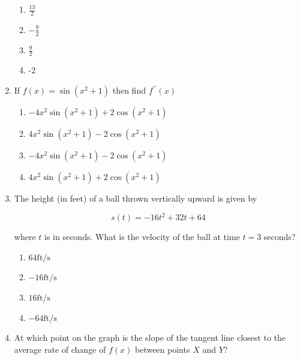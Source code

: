 \documentclass{article}
\begin{document}
\begin{enumerate}
\begin{minipage}[t]{\linewidth}
		\begin{enumerate}
		\setlength\itemsep{2em}
			\item  $\frac{13}{2}$ 
			\item  $-\frac{9}{2}$ 
			\item  $\frac{9}{2}$ 
			\item  -2 
		\end{enumerate}
	\end{minipage}
	\item
	\begin{minipage}[t]{\linewidth}
		If \(f(x)=\sin \left(x^{2}+1\right)\) then find \(f^{\prime \prime}(x)\)


		\vspace{1em}

		\begin{enumerate}
		\setlength\itemsep{2em}
			\item  $-4 x^{2} \sin \left(x^{2}+1\right)+2 \cos \left(x^{2}+1\right)$ 
			\item  $4 x^{2} \sin \left(x^{2}+1\right)-2 \cos \left(x^{2}+1\right)$ 
			\item  $-4 x^{2} \sin \left(x^{2}+1\right)-2 \cos \left(x^{2}+1\right)$ 
			\item  $4 x^{2} \sin \left(x^{2}+1\right)+2 \cos \left(x^{2}+1\right)$ 
		\end{enumerate}
	\end{minipage}
	\item
	\begin{minipage}[t]{\linewidth}
		The height (in feet) of a ball thrown vertically upward is given by

\[
s(t)=-16 t^{2}+32 t+64
\]

where \(t\) is in seconds. What is the velocity of the ball at time
\(t=3\) seconds?


		\vspace{1em}

		\begin{enumerate}
		\setlength\itemsep{2em}
			\item  $64 \mathrm{ft} / \mathrm{s}$ 
			\item  $-16 \mathrm{ft} / \mathrm{s}$ 
			\item  $16 \mathrm{ft} / \mathrm{s}$ 
			\item  $-64 \mathrm{ft} / \mathrm{s}$ 
		\end{enumerate}
	\end{minipage}
	\item
	\begin{minipage}[t]{\linewidth}
		At which point on the graph is the slope of the tangent line closest to
the average rate of change of \(f(x)\) between points \(X\) and \(Y\)?


\end{minipage}
\end{enumerate}
\end{document}
